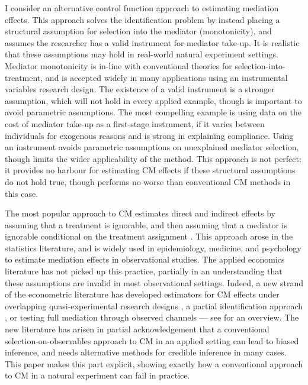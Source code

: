 I consider an alternative control function approach to estimating mediation effects.
This approach solves the identification problem by instead placing a structural assumption for selection into the mediator (monotonicity), and assumes the researcher has a valid instrument for mediator take-up.
It is realistic that these assumptions may hold in real-world natural experiment settings.
Mediator monotonicity is in-line with conventional theories for selection-into-treatment, and is accepted widely in many applications using an instrumental variables research design.
The existence of a valid instrument is a stronger assumption, which will not hold in every applied example, though is important to avoid parametric assumptions. %
The most compelling example is using data on the cost of mediator take-up as a first-stage instrument, if it varies between individuals for exogenous reasons and is strong in explaining compliance.
Using an instrument avoids parametric assumptions on unexplained mediator selection, though limits the wider applicability of the method.
This approach is not perfect: it provides no harbour for estimating CM effects if these structural assumptions do not hold true, though performs no worse than conventional CM methods in this case.

The most popular approach to CM estimates direct and indirect effects by assuming that a treatment is ignorable, and then assuming that a mediator is ignorable conditional on the treatment assignment \citep{imai2010identification}.
This approach arose in the statistics literature, and is widely used in epidemiology, medicine, and psychology to estimate mediation effects in observational studies.
The applied economics literature has not picked up this practice, partially in an understanding that these assumptions are invalid in most observational settings.
Indeed, a new strand of the econometric literature has developed estimators for CM effects under overlapping quasi-experimental research designs \citep{frolich2017direct,deuchert2019direct}, a partial identification approach \citep{flores2009identification}, or testing full mediation through observed channels \citep{kwon2024testing} --- see \cite{huber2019review} for an overview.
The new literature has arisen in partial acknowledgement that a conventional selection-on-observables approach to CM in an applied setting can lead to biased inference, and needs alternative methods for credible inference in many cases.
This paper makes this part explicit, showing exactly how a conventional approach to CM in a natural experiment can fail in practice.


